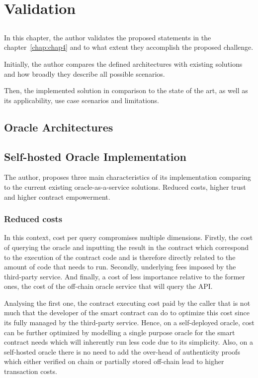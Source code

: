 \chapter{Validation} \label{chap:chap7}

\section*{}
In this chapter, the author validates the proposed statements in the chapter~\ref{chap:chap4} and to what extent they accomplish the proposed challenge.

Initially, the author compares the defined architectures with existing solutions and how broadly they describe all possible scenarios.

Then, the implemented solution in comparison to the state of the art, as well as its applicability, use case scenarios and limitations.


\section{Oracle Architectures}


\section{Self-hosted Oracle Implementation}

The author, proposes three main characteristics of its implementation comparing to the current existing oracle-as-a-service solutions. Reduced costs, higher trust and higher contract empowerment.


\subsection{Reduced costs}

In this context, cost per query compromises multiple dimensions. Firstly, the cost of querying the oracle and inputting the result in the contract which correspond to the execution of the contract code and is therefore directly related to the amount of code that needs to run. Secondly, underlying fees imposed by the third-party service. And finally, a cost of less importance relative to the former ones, the cost of the off-chain oracle service that will query the API.

Analysing the first one, the contract executing cost paid by the caller that is not much that the developer of the smart contract can do to optimize this cost since its fully managed by the third-party service. Hence, on a self-deployed oracle, cost can be further optimized by modelling a single purpose oracle for the smart contract needs which will inherently run less code due to its simplicity. Also, on a self-hosted oracle there is no need to add the over-head of authenticity proofs which either verified on chain or partially stored off-chain lead to higher transaction costs.

